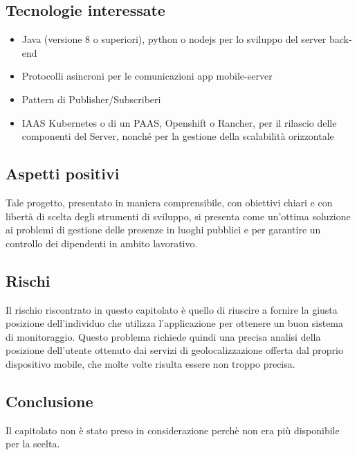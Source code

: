 \documentclass[../studio-di-fattibilita.tex]{subfiles}
\begin{document}
\subsection{Tecnologie interessate}%
\label{sub:tecnologie_interessate}
\begin{itemize}
  \item Java (versione 8 o superiori), python o nodejs per lo sviluppo del server back-end
  \item Protocolli asincroni per le comunicazioni app mobile-server
  \item Pattern di Publisher/Subscriberi
  \item IAAS Kubernetes o di un PAAS, Openshift o Rancher, per il rilascio delle componenti del Server, nonché per la gestione della scalabilità orizzontale
\end{itemize}

\subsection{Aspetti positivi}%
\label{sub:aspetti_positivi}
Tale progetto, presentato in maniera comprensibile, con obiettivi chiari e con libertà di scelta degli strumenti di sviluppo, si presenta come un'ottima soluzione ai problemi di gestione delle presenze in luoghi pubblici  e per garantire un controllo dei dipendenti in ambito lavorativo.

\subsection{Rischi}%
\label{sub:rischi}
Il rischio riscontrato in questo capitolato è quello di riuscire a fornire la giusta posizione dell'individuo che utilizza l'applicazione per ottenere un buon sistema di monitoraggio. Questo problema richiede quindi una precisa analisi della posizione dell'utente ottenuto dai servizi di geolocalizzazione offerta dal proprio dispositivo mobile, che molte volte risulta essere non troppo precisa.

\subsection{Conclusione}%
\label{sub:conclusione}
Il capitolato non è stato preso in considerazione perchè non era più disponibile per la scelta.
\end{document}

